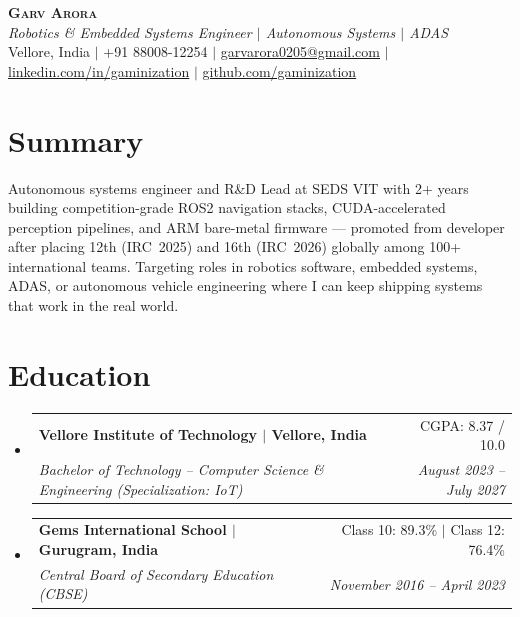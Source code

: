 \documentclass[letterpaper,10pt]{article}
\makeatletter
\newcommand{\resumeSubheading}[4]{
  \item
    \begin{tabular*}{0.97\textwidth}[t]{l@{\extracolsep{\fill}}r}
      \textbf{#1} & #2 \\
      \textit{\small#3} & \textit{\small #4} \\
    \end{tabular*}\vspace{-4pt}
}
\newcommand{\resumeSubHeadingListStart}{
  \begin{itemize}[leftmargin=0.15in, label={}, itemsep=4pt, parsep=0pt, topsep=2pt]
}
\newcommand{\resumeSubHeadingListEnd}{\end{itemize}}
\makeatother
\begin{document}
\begin{center}
    \textbf{\Huge \scshape Garv Arora} \\ \vspace{2pt}
    \small\textit{Robotics \& Embedded Systems Engineer $|$ Autonomous Systems $|$ ADAS} \\ \vspace{2pt}
    \small Vellore, India $|$
    +91 88008-12254 $|$
    \href{mailto:garvarora0205@gmail.com}{garvarora0205@gmail.com} $|$
    \href{https://linkedin.com/in/gaminization}{linkedin.com/in/gaminization} $|$
    \href{https://github.com/gaminization}{github.com/gaminization}
\end{center}

\section{Summary}
\vspace{2pt}
\small{Autonomous systems engineer and R\&D Lead at SEDS VIT with 2+ years building competition-grade ROS2 navigation stacks, CUDA-accelerated perception pipelines, and ARM bare-metal firmware --- promoted from developer after placing 12th (IRC~2025) and 16th (IRC~2026) globally among 100+ international teams. Targeting roles in robotics software, embedded systems, ADAS, or autonomous vehicle engineering where I can keep shipping systems that work in the real world.}

\section{Education}
  \resumeSubHeadingListStart
    \resumeSubheading
      {Vellore Institute of Technology $|$ Vellore, India}{CGPA: 8.37 / 10.0}
      {Bachelor of Technology -- Computer Science \& Engineering (Specialization: IoT)}{August 2023 -- July 2027}
    \resumeSubheading
      {Gems International School $|$ Gurugram, India}{Class 10: 89.3\% $|$ Class 12: 76.4\%}
      {Central Board of Secondary Education (CBSE)}{November 2016 -- April 2023}
  \resumeSubHeadingListEnd

\end{document}
